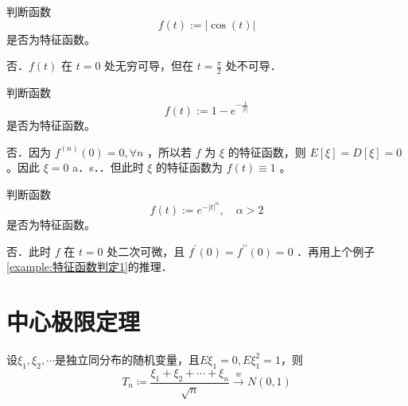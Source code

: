 \begin{example}
    判断函数
    $$
        f(t):=|\cos (t)|
    $$
    是否为特征函数。
\end{example}
\begin{solution}
    否．$f(t)$ 在 $t=0$ 处无穷可导，但在 $t=\frac{\pi}{2}$ 处不可导．
\end{solution}
\begin{example}\label{example:特征函数判定1}
    判断函数
    $$
        f(t):=1-e^{-\frac{1}{|t|}}
    $$
    是否为特征函数。
\end{example}
\begin{solution}
    否．因为 $f^{(n)}(0)=0, \forall n$ ，所以若 $f$ 为 $\xi$ 的特征函数，则 $E[\xi]=D[\xi]=0$ 。因此 $\xi=0$ a．s．．但此时 $\xi$ 的特征函数为 $f(t) \equiv 1$ 。
\end{solution}
\begin{example}
    判断函数
    $$
        f(t):=e^{-|t|^\alpha}, \quad \alpha>2
    $$
    是否为特征函数。
\end{example}
\begin{solution}
    否．此时 $f$ 在 $t=0$ 处二次可微，且 $f^{\prime}(0)=f^{\prime \prime}(0)=0$ ．再用上个例子\ref{example:特征函数判定1}的推理．
\end{solution}

\section{中心极限定理}
\begin{theorem}[Laplace中心极限定理]\label{LaplaceCLT}
    设$\xi_1,\xi_2,\cdots$是独立同分布的随机变量，且$E\xi_1=0,E\xi_1^2=1$，则
    $$
        T_n\coloneqq\frac{\xi_1+\xi_2+\cdots+\xi_n}{\sqrt{n}}\xrightarrow{w}N(0,1)
    $$
\end{theorem}

